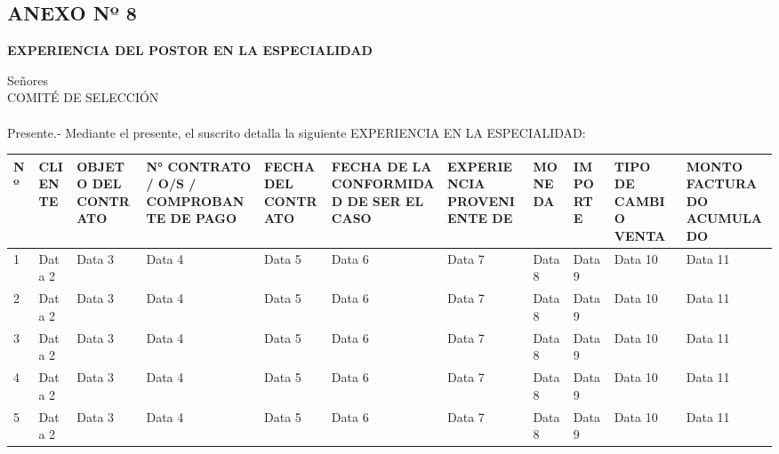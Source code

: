 \begin{landscape} %
    \begin{center}
    \section*{ANEXO Nº 8 } 
    \textbf{EXPERIENCIA DEL POSTOR EN LA ESPECIALIDAD}
    \end{center}
    
    Señores \\
    COMITÉ DE SELECCIÓN \\
    \nomenclatura \\
    Presente.-
    Mediante el presente, el suscrito detalla la siguiente EXPERIENCIA EN LA ESPECIALIDAD:
    
    \vspace{0.5cm}
    
    \begin{table}[h!]
    \centering
    \tiny %
    \begin{tabular}{|p{0.25cm}|p{1.5cm}|p{2cm}|p{2.5cm}|p{2cm}|p{2cm}|p{2cm}|p{1.2cm}|p{1.2cm}|p{2cm}|p{2cm}|} %
    \hline
    \textbf{Nº} & \textbf{CLIENTE} & \textbf{OBJETO DEL CONTRATO} & \textbf{N° CONTRATO / O/S / COMPROBANTE DE PAGO} & \textbf{FECHA DEL CONTRATO} & \textbf{FECHA DE LA CONFORMIDAD DE SER EL CASO} & \textbf{EXPERIENCIA PROVENIENTE DE} & \textbf{MONEDA} & \textbf{IMPORTE} & \textbf{TIPO DE CAMBIO VENTA} & \textbf{MONTO FACTURADO ACUMULADO} \\ \hline
    1 & Data 2 & Data 3 & Data 4 & Data 5 & Data 6 & Data 7 & Data 8 & Data 9 & Data 10 & Data 11 \\ \hline
    2 & Data 2 & Data 3 & Data 4 & Data 5 & Data 6 & Data 7 & Data 8 & Data 9 & Data 10 & Data 11 \\ \hline
    3 & Data 2 & Data 3 & Data 4 & Data 5 & Data 6 & Data 7 & Data 8 & Data 9 & Data 10 & Data 11 \\ \hline
    4 & Data 2 & Data 3 & Data 4 & Data 5 & Data 6 & Data 7 & Data 8 & Data 9 & Data 10 & Data 11 \\ \hline
    5 & Data 2 & Data 3 & Data 4 & Data 5 & Data 6 & Data 7 & Data 8 & Data 9 & Data 10 & Data 11 \\ \hline
    \end{tabular}
    \end{table}
    \normalsize %
    

\end{landscape}

